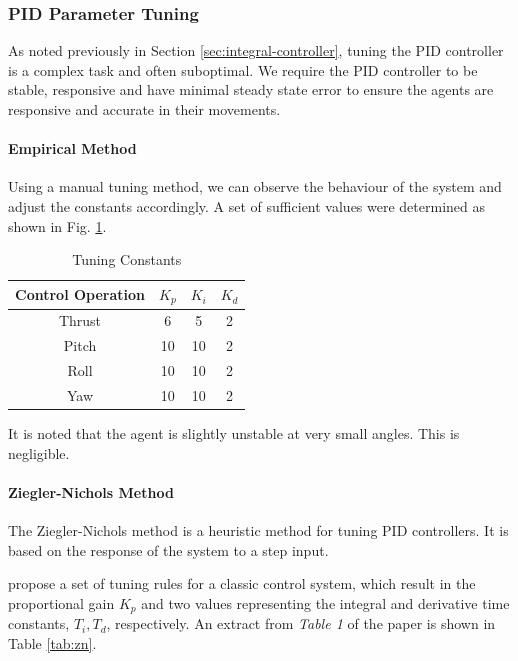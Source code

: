 \documentclass[12pt]{article}
\begin{document}
\subsubsection{PID Parameter Tuning}
\label{sec:pid-tuning}
As noted previously in Section \ref{sec:integral-controller}, tuning the PID controller is a complex task and often suboptimal\cite{skogestad2001probably}. We require the PID controller to be stable, responsive and have minimal steady state error to ensure the agents are responsive and accurate in their movements.

\paragraph{Empirical Method}

Using a manual tuning method, we can observe the behaviour of the system and adjust the constants accordingly. A set of sufficient values were determined as shown in Fig. \ref{tab:pid-tuning}.

\begin{table}[H]
    \centering
        \begin{tabular}{| c | c | c | c |} 
        \hline
        Control Operation & $K_p$ & $K_i$ & $K_d$ \\ 
        \hline
        Thrust & 6 & 5 & 2 \\
        \hline
        Pitch & 10 & 10 & 2 \\
        \hline
        Roll & 10 & 10 & 2 \\
        \hline
        Yaw & 10 & 10 & 2 \\
        \hline
        \end{tabular}
        \caption{Tuning Constants}
        \label{tab:pid-tuning}
\end{table}

It is noted that the agent is slightly unstable at very small angles. This is negligible.

\paragraph{Ziegler-Nichols Method}
The Ziegler-Nichols method is a heuristic method for tuning PID controllers. It is based on the response of the system to a step input.

\citet{McCormack} propose a set of tuning rules for a classic control system, which result in the proportional gain $K_p$ and two values representing the integral and derivative time constants, $T_i,T_d$, respectively. An extract from \emph{Table 1} of the paper is shown in Table \ref{tab:zn}.
\end{document}
